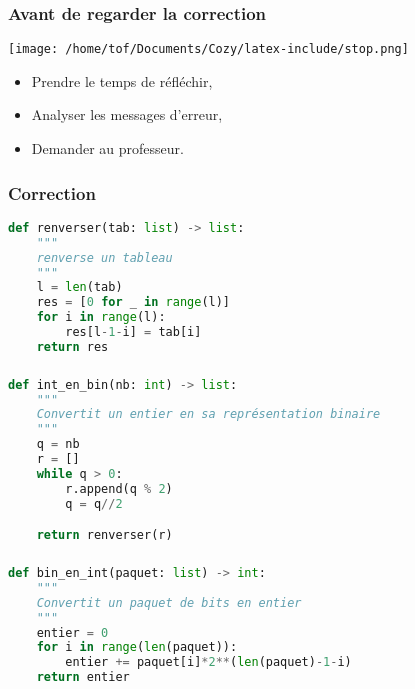 \documentclass[svgnames,11pt]{beamer}
\begin{document}
\begin{frame}
    \frametitle{Avant de regarder la correction}
\begin{center}
    \centering
    \texttt{[image: /home/tof/Documents/Cozy/latex-include/stop.png]}
    \end{center}
{\Large
    \begin{itemize}
        \item Prendre le temps de réfléchir,
        \item Analyser les messages d'erreur,
        \item Demander au professeur.
    \end{itemize}
}
\end{frame}
\begin{frame}[fragile]
    \frametitle{Correction}

\begin{center}
\begin{lstlisting}[language=Python , basicstyle=\ttfamily\small, xleftmargin=0.2em, xrightmargin=0em]
def renverser(tab: list) -> list:
    """
    renverse un tableau
    """
    l = len(tab)
    res = [0 for _ in range(l)]
    for i in range(l):
        res[l-1-i] = tab[i]
    return res
\end{lstlisting}
\end{center}

\end{frame}
\begin{frame}[fragile]
    \frametitle{}


\begin{center}
\begin{lstlisting}[language=Python , basicstyle=\ttfamily\small, xleftmargin=0.2em, xrightmargin=0em]
def int_en_bin(nb: int) -> list:
    """
    Convertit un entier en sa représentation binaire
    """
    q = nb
    r = []
    while q > 0:
        r.append(q % 2)
        q = q//2

    return renverser(r)
\end{lstlisting}
\end{center}

\end{frame}

\begin{frame}[fragile]
    \frametitle{}


\begin{center}
\begin{lstlisting}[language=Python , basicstyle=\ttfamily\small, xleftmargin=0.2em, xrightmargin=-0.5em]
def bin_en_int(paquet: list) -> int:
    """
    Convertit un paquet de bits en entier
    """
    entier = 0
    for i in range(len(paquet)):
        entier += paquet[i]*2**(len(paquet)-1-i)
    return entier
\end{lstlisting}
\end{center}

\end{frame}
\end{document}
